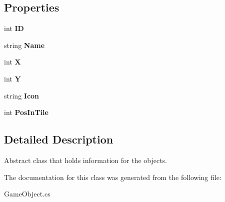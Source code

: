 \subsection*{Properties}
\begin{DoxyCompactItemize}
\item 
\mbox{\label{class_roguelike_r_p_g_1_1_game_object_ac74edfab8ad8acb0286337a78ae0c5ae}} 
int {\bfseries ID}
\item 
\mbox{\label{class_roguelike_r_p_g_1_1_game_object_a10d65dd355cb9d8d2fe56a01894809ef}} 
string {\bfseries Name}
\item 
\mbox{\label{class_roguelike_r_p_g_1_1_game_object_a98f1d2ad9bc6ec7e7a71071aae35ba03}} 
int {\bfseries X}
\item 
\mbox{\label{class_roguelike_r_p_g_1_1_game_object_a0c27f37c3a04fdb5203cbc3b46ddcc0a}} 
int {\bfseries Y}
\item 
\mbox{\label{class_roguelike_r_p_g_1_1_game_object_ab51d4d46d06a314e2d4c39ed57c29c9d}} 
string {\bfseries Icon}
\item 
\mbox{\label{class_roguelike_r_p_g_1_1_game_object_af9101b4a662b532e43b9d21f2594ddcd}} 
int {\bfseries Pos\+In\+Tile}
\end{DoxyCompactItemize}


\subsection{Detailed Description}
Abstract class that holds information for the objects. 



The documentation for this class was generated from the following file\+:\begin{DoxyCompactItemize}
\item 
Game\+Object.\+cs\end{DoxyCompactItemize}
